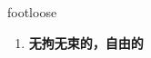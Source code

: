 
\begin{frame}
{\huge footloose}
\begin{center}
\begin{enumerate}\Large
  \item \textbf{无拘无束的，自由的}
\end{enumerate}
\end{center}
\end{frame}

